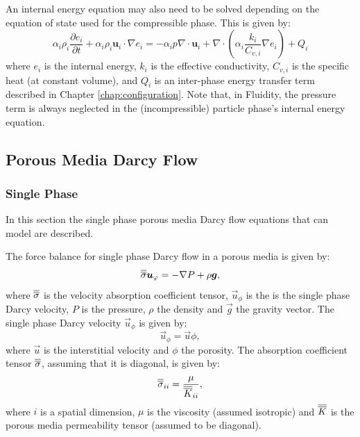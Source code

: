 An internal energy equation may also need to be solved depending on the equation of state used for the compressible phase. This is given by:
\begin{equation}
\alpha_i\rho_i\frac{\partial e_i}{\partial t} + \alpha_i\rho_i\mathbf{u}_i\cdot\nabla e_i = -\alpha_i p\nabla\cdot\mathbf{u}_i + \nabla\cdot\left(\alpha_i\frac{k_i}{C_{v,i}}\nabla e_i\right) + Q_i
\end{equation}
where $e_i$ is the internal energy, $k_i$ is the effective conductivity, $C_{v,i}$ is the specific heat (at constant volume), and $Q_i$ is an inter-phase energy transfer term described in Chapter \ref{chap:configuration}. Note that, in Fluidity, the pressure term is always neglected in the (incompressible) particle phase's internal energy equation.

\subsection{Porous Media Darcy Flow}
\label{sec:porous_media_darcy_flow_equations}

\subsubsection{Single Phase}

In this section the single phase porous media Darcy flow equations that \fluidity can model are described.

The force balance for single phase Darcy flow in a porous media is given by:
\begin{equation}
   \label{eq:mom_press_single_phase_darcy}
   \overline{\overline{\sigma}} {\mbox{\boldmath$u$}}_{\varphi} = 
   - \nabla P + \rho {\mbox{\boldmath$g$}},
\end{equation}
where $\overline{\overline{\sigma}}$ is the velocity absorption coefficient tensor, $\vec{u}_{\phi}$ is the is the single phase Darcy velocity, $P$ is the pressure, $\rho$ the density and $\vec{g}$ the gravity vector. The single phase Darcy velocity $\vec{u}_{\phi}$ is given by:
\begin{equation}
   \vec{u}_{\phi} = \vec{u} \phi,
\end{equation}
where $\vec{u}$ is the interstitial velocity and $\phi$ the porosity. The absorption coefficient tensor $\overline{\overline{\sigma}}$, assuming that it is diagonal, is given by:
\begin{equation}
   \label{eq:single_phase_darcy_velocity_abs}
   \overline{\overline{\sigma}}_{ii} = \frac{ \mu } { \overline{\overline{K}}_{ii} },
\end{equation}
where $i$ is a spatial dimension, $\mu$ is the viscosity (assumed isotropic) and $\overline{\overline{K}}$ is the porous media permeability tensor (assumed to be diagonal).


